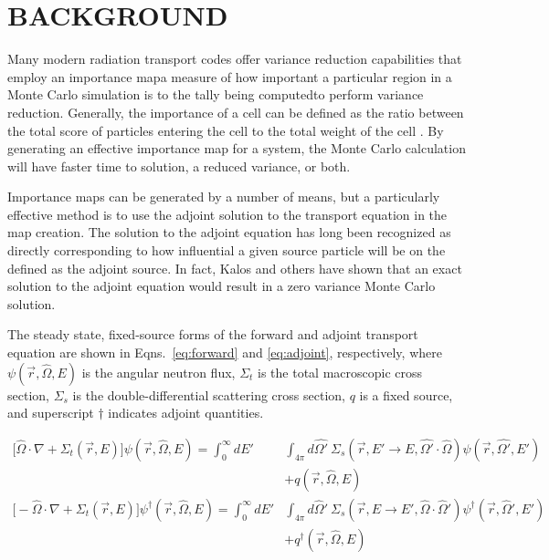 \documentclass[12pt]{article}
\newcommand{\Macro}{\ensuremath{\Sigma}}
\newcommand{\vOmega}{\ensuremath{\hat{\Omega}}}
\newcommand{\rvec}{\ensuremath{\vec{r}}}
\begin{document}
%
\section{BACKGROUND}
\label{sect::second}

Many modern radiation transport codes offer variance reduction capabilities that employ an importance map\textemdash a measure of how important a particular region in a Monte Carlo simulation is to the tally being computed\textemdash to perform variance reduction. Generally, the importance of a cell can be defined as the ratio between the total score of particles entering the cell to the total weight of the cell \cite{booth_automatic_1982}. By generating an effective importance map for a system, the Monte Carlo calculation will have faster time to solution, a reduced variance, or both. 

Importance maps can be generated by a number of means, but a particularly effective method is to use the adjoint solution to the transport equation in the map creation. 
The solution to the adjoint equation has long been recognized as 
directly corresponding to how influential a given source particle will be on the defined as the adjoint source.
In fact, Kalos \cite{kalos_importance_1963, goertzel_monte_1958} and others have shown that an exact solution to the adjoint equation would result in a zero variance Monte Carlo solution. 

The steady state, fixed-source forms of the forward and adjoint transport equation are shown in Eqns.~\ref{eq:forward} and \ref{eq:adjoint}, respectively, where $\psi(\vec{r}, \hat{\Omega}, E)$ is the angular neutron flux, $\Sigma_t$ is the total macroscopic cross section, $\Sigma_s$ is the double-differential scattering cross section, $q$ is a fixed source, and superscript $\dagger$ indicates adjoint quantities.

\begin{align}
\bigl[\hat{\Omega} \cdot \nabla + \Macro_t(\vec{r}, E)\bigr] \psi(\vec{r}, \hat{\Omega}, E)  =  \int_0^{\infty} dE' &\int_{4\pi} d\hat{\Omega'} \:\Macro_{s}(\vec{r}, E' \to E, \hat{\Omega'} \cdot \hat{\Omega}) \psi(\vec{r}, \hat{\Omega'}, E')\nonumber \\
 &+ q(\vec{r}, \vOmega, E) \label{eq:forward} \\
%
\bigl[-\vOmega \cdot \nabla + \Sigma_t(\rvec, E)\bigr] \psi^{\dagger}(\vec{r}, \vOmega, E) = \int_0^{\infty} dE' &\int_{4\pi} d\vOmega' \: \Sigma_s(\rvec, E \rightarrow E', \vOmega \cdot \vOmega') \psi^{\dagger}(\rvec, \vOmega', E') \nonumber \\
&+ q^{\dagger}(\vec{r}, \vOmega, E) \label{eq:adjoint}
\end{align}
\end{document}
